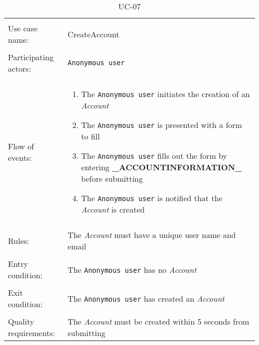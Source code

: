 \documentclass[../report.tex]{subfiles}
\begin{document}
\noindent
\begin{table}
\caption{UC-07}
\label{UC-07}
\begin{tabular}{ l p{8cm} } 
\hline       
\\                
Use case name:  & CreateAccount   \\   \hline  \\              
Participating actors:  & \texttt{Anonymous user} \\   \hline \\
Flow of events: & \begin{enumerate}
\item{The \texttt{Anonymous user} initiates the creation of an \textit{Account}}
\item{The \texttt{Anonymous user} is presented with a form to fill}
\item{The \texttt{Anonymous user} fills out the form by entering \textbf{\_ACCOUNTINFORMATION\_} before submitting} %
\item{The \texttt{Anonymous user} is notified that the \textit{Account} is created}
\end{enumerate}
\\   \hline \\
Rules: & The \textit{Account} must have a unique user name and email \\ \hline \\
Entry condition: & The \texttt{Anonymous user} has no \textit{Account} \\ \hline \\
Exit condition: & The \texttt{Anonymous user} has created an \textit{Account} \\ \hline \\
Quality requirements: & The \textit{Account} must be created within 5 seconds from submitting \\  \hline      
\end{tabular} \\
\end{table}
\end{document}
